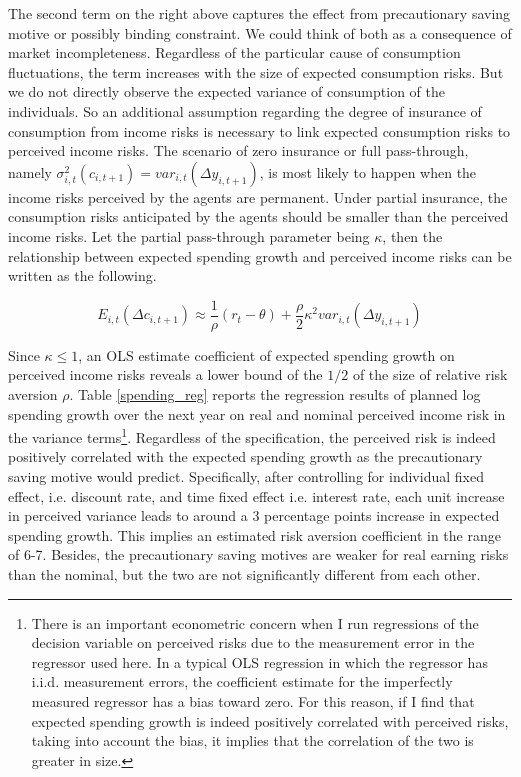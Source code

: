 The second term on the right above captures the effect from precautionary saving motive or possibly binding constraint. We could think of both as a consequence of market incompleteness\citep{parker2005precautionary}. Regardless of the particular cause of consumption fluctuations, the term increases with the size of expected consumption risks. But we do not directly observe the expected variance of consumption of the individuals. So an additional assumption regarding the degree of insurance of consumption from income risks is necessary to link expected consumption risks to perceived income risks. The scenario of zero insurance or full pass-through, namely $\sigma^2_{i,t}(c_{i,t+1})=var_{i,t}(\Delta y_{i,t+1})$, is most likely to happen when the income risks perceived by the agents are permanent. Under partial insurance, the consumption risks anticipated by the agents should be smaller than the perceived income risks. Let the partial pass-through parameter being $\kappa$, then the relationship between expected spending growth and perceived income risks can be written as the following. 


\begin{equation}
    E_{i,t}(\Delta c_{i,t+1}) \approx \frac{1}{\rho}(r_t-\theta) + \frac{\rho}{2}\kappa^2 var_{i,t}(\Delta y_{i,t+1})
\end{equation}

Since $\kappa\leq 1$, an OLS estimate coefficient of expected spending growth on perceived income risks reveals a lower bound of the $1/2$ of the size of relative risk aversion $\rho$. Table \ref{spending_reg} reports the regression results of planned
log spending growth over the next year on real and nominal perceived income risk in the variance terms\footnote{There is an important econometric concern when I run regressions of the decision variable on perceived risks due to the measurement error in the regressor used here. In a typical OLS regression in which the regressor has i.i.d. measurement errors, the coefficient estimate for the imperfectly measured regressor has a bias toward zero. For this reason, if I find that expected spending growth is indeed positively correlated with perceived risks, taking into account the bias, it implies that the correlation of the two is greater in size.}. Regardless of the specification, the perceived risk is indeed positively correlated with the expected spending growth as the precautionary saving motive would predict. Specifically, after controlling for individual fixed effect, i.e. discount rate, and time fixed effect i.e. interest rate, each unit increase in perceived variance leads to around a 3 percentage points increase in expected spending growth. This implies an estimated risk aversion coefficient in the range of 6-7. Besides, the precautionary saving motives are weaker for real earning risks than the nominal, but the two are not significantly different from each other. 

